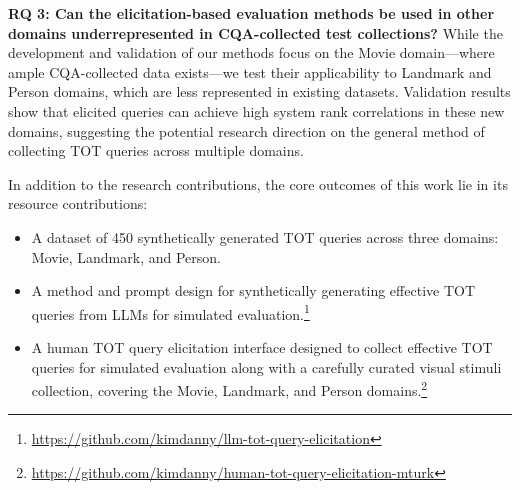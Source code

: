 \textbf{RQ 3: Can the elicitation-based evaluation methods be used in other domains underrepresented in CQA-collected test collections?}
While the development and validation of our methods focus on the Movie domain---where ample CQA-collected data exists---we test their applicability to Landmark and Person domains, which are less represented in existing datasets. Validation results show that elicited queries can achieve high system rank correlations in these new domains, suggesting the potential research direction on the general method of collecting TOT queries across multiple domains.



In addition to the research contributions, the core outcomes of this work lie in its resource contributions:
\begin{itemize}
    \item A dataset of 450 synthetically generated TOT queries across three domains: Movie, Landmark, and Person.
    
    \item A method and prompt design for synthetically generating effective TOT queries from LLMs for simulated evaluation.\footnote{\url{https://github.com/kimdanny/llm-tot-query-elicitation}}
    
    \item A human TOT query elicitation interface designed to collect effective TOT queries for simulated evaluation along with a carefully curated visual stimuli collection, covering the Movie, Landmark, and Person domains.\footnote{\url{https://github.com/kimdanny/human-tot-query-elicitation-mturk}}
\end{itemize}
